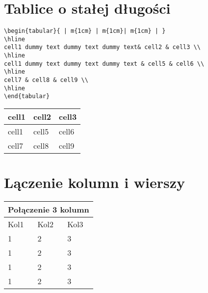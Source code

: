 \documentclass{beamer}
\begin{document}
\section{Tablice o stałej długości}

\begin{frame}[fragile]
\begin{lstlisting}
\begin{tabular}{ | m{1cm} | m{1cm}| m{1cm} | } 
\hline
cell1 dummy text dummy text dummy text& cell2 & cell3 \\ 
\hline
cell1 dummy text dummy text dummy text & cell5 & cell6 \\ 
\hline
cell7 & cell8 & cell9 \\ 
\hline
\end{tabular}
\end{lstlisting}
\end{frame}

\begin{frame}
 \begin{center}
\begin{tabular}{ | m{2cm} | m{1cm}| m{3cm} | } 
\hline
cell1 & cell2 & cell3 \\ 
\hline
cell1 & cell5 & cell6 \\ 
\hline
cell7 & cell8 & cell9 \\ 
\hline
\end{tabular}
\end{center}
\end{frame}

\section{Lączenie kolumn i wierszy}



\begin{frame}
\begin{center}
\begin{tabular}{ |p{2cm}|p{2cm}|p{2cm}|  }
 \hline
 \multicolumn{3}{|c|}{Połączenie 3 kolumn} \\
 \hline
 Kol1&Kol2&Kol3\\
 \hline
 1 & 2 & 3\\
 1 & 2 & 3\\
 1 & 2 & 3\\
 1 & 2 & 3\\
 \hline
\end{tabular}
\end{center}
\end{frame}
\end{document}
